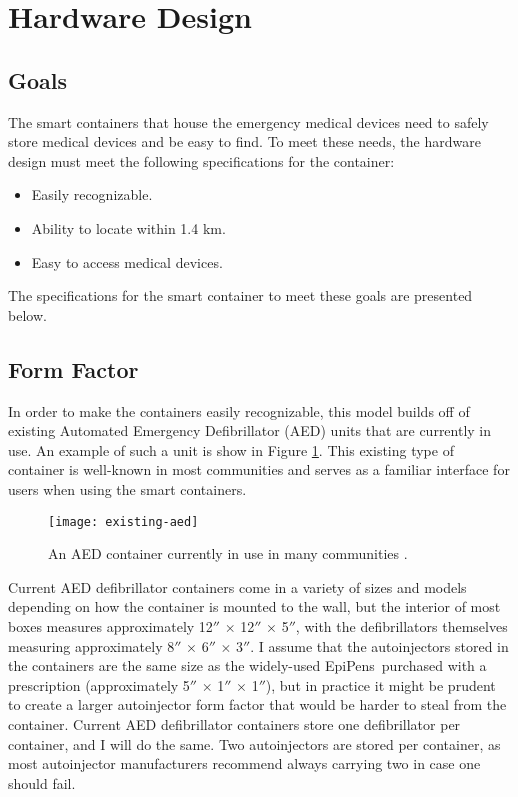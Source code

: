 \section{Hardware Design} \label{sec:hard-design}

\onehalfspacing

\subsection{Goals} \label{sec:hard-design-goals}

The smart containers that house the emergency medical devices need to safely store medical devices and be easy to find. To meet these needs, the hardware design must meet the following specifications for the container:
\begin{itemize}
    \item Easily recognizable.
    \item Ability to locate within 1.4 km.
    \item Easy to access medical devices.
\end{itemize}
The specifications for the smart container to meet these goals are presented below.

\subsection{Form Factor} \label{sec:hard-formfactor}

In order to make the containers easily recognizable, this model builds off of existing Automated Emergency Defibrillator (AED) units that are currently in use. An example of such a unit is show in Figure \ref{fig:existing-aed}. This existing type of container is well-known in most communities and serves as a familiar interface for users when using the smart containers.

\begin{figure}[h]
    \begin{center}
    \texttt{[image: existing-aed]}
    \caption{ An AED container currently in use in many communities \cite{aed-image}.}
    \label{fig:existing-aed}
    \end{center}
\end{figure}

Current AED defibrillator containers come in a variety of sizes and models depending on how the container is mounted to the wall, but the interior of most boxes measures approximately 12$''$ $\times$ 12$''$ $\times$ 5$''$, with the defibrillators themselves measuring approximately 8$''$ $\times$ 6$''$ $\times$ 3$''$. I assume that the autoinjectors stored in the containers are the same size as the widely-used EpiPens\textregistered~purchased with a prescription (approximately 5$''$ $\times$ 1$''$ $\times$ 1$''$), but in practice it might be prudent to create a larger autoinjector form factor that would be harder to steal from the container. Current AED defibrillator containers store one defibrillator per container, and I will do the same. Two autoinjectors are stored per container, as most autoinjector manufacturers recommend always carrying two in case one should fail.

